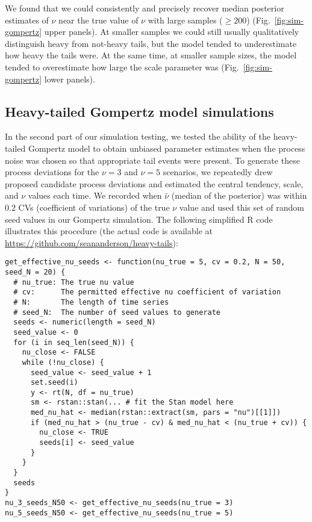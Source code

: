 We found that we could consistently and precisely recover median posterior estimates of $\nu$ near the true value of $\nu$ with large samples ($\ge 200$) (Fig.~\ref{fig:sim-gompertz} upper panels). At smaller samples we could still usually qualitatively distinguish heavy from not-heavy tails, but the model tended to underestimate how heavy the tails were. At the same time, at smaller sample sizes, the model tended to overestimate how large the scale parameter was (Fig.~\ref{fig:sim-gompertz} lower panels).

\subsection{Heavy-tailed Gompertz model simulations}

In the second part of our simulation testing, we tested the ability of the heavy-tailed Gompertz model to obtain unbiased parameter estimates when the process noise was chosen so that appropriate tail events were present. To generate these process deviations for the $\nu = 3$ and $\nu = 5$ scenarios, we repeatedly drew proposed candidate process deviations and estimated the central tendency, scale, and $\nu$ values each time. We recorded when $\hat{\nu}$ (median of the posterior) was within $0.2$ CVs (coefficient of variations) of the true $\nu$ value and used this set of random seed values in our Gompertz simulation. The following simplified R code illustrates this procedure (the actual code is available at \url{https://github.com/seananderson/heavy-tails}):

\begin{footnotesize}
\begin{verbatim}
get_effective_nu_seeds <- function(nu_true = 5, cv = 0.2, N = 50, seed_N = 20) {
  # nu_true: The true nu value
  # cv:      The permitted effective nu coefficient of variation
  # N:       The length of time series
  # seed_N:  The number of seed values to generate
  seeds <- numeric(length = seed_N)
  seed_value <- 0
  for (i in seq_len(seed_N)) {
    nu_close <- FALSE
    while (!nu_close) {
      seed_value <- seed_value + 1
      set.seed(i)
      y <- rt(N, df = nu_true)
      sm <- rstan::stan(... # fit the Stan model here
      med_nu_hat <- median(rstan::extract(sm, pars = "nu")[[1]])
      if (med_nu_hat > (nu_true - cv) & med_nu_hat < (nu_true + cv)) {
        nu_close <- TRUE
        seeds[i] <- seed_value
      }
    }
  }
  seeds
}
nu_3_seeds_N50 <- get_effective_nu_seeds(nu_true = 3)
nu_5_seeds_N50 <- get_effective_nu_seeds(nu_true = 5)
\end{verbatim}
\end{footnotesize}


